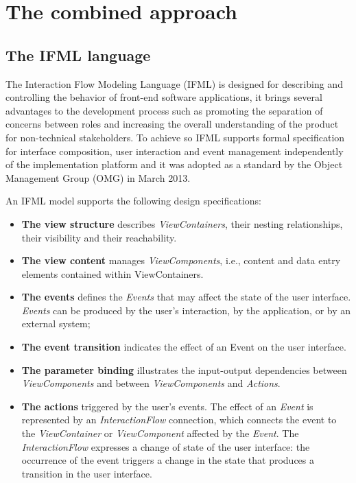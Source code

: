 \chead{}
\chapter{The combined approach}

\section{The IFML language}

The Interaction Flow Modeling Language (IFML)\cite{IFML-1, IFML-2} is designed for describing and controlling the behavior of front-end software applications, it brings several advantages to the development process such as promoting the separation of concerns between roles and increasing the overall understanding of the product for non-technical stakeholders. To achieve so IFML supports formal specification for interface composition, user interaction and event management independently of the implementation platform and it was adopted as a standard by the Object Management Group (OMG) in March 2013.

An IFML model supports the following design specifications: 

\begin{itemize}
  \item \textbf{The view structure} describes \textit{ViewContainers}, their nesting relationships, their visibility and their reachability.
  
  \item \textbf{The view content} manages \textit{ViewComponents}, i.e., content and data entry elements contained within ViewContainers.
  
  \item \textbf{The events} defines the \textit{Events} that may affect the state of the user interface. \textit{Events} can be produced by the user’s interaction, by the application, or by an external system; 

  \item \textbf{The event transition} indicates the effect of an Event on the user interface. 

  \item \textbf{The parameter binding} illustrates the input-output dependencies between \textit{ViewComponents} and between \textit{ViewComponents} and \textit{Actions}. 

  \item \textbf{The actions} triggered by the user’s events. The effect of an \textit{Event} is represented by an \textit{InteractionFlow} connection, which connects the event to the \textit{ViewContainer} or \textit{ViewComponent} affected by the \textit{Event}. The \textit{InteractionFlow} expresses a change of state of the user interface: the occurrence of the event triggers a change in the state that produces a transition in the user interface.

\end{itemize} 

